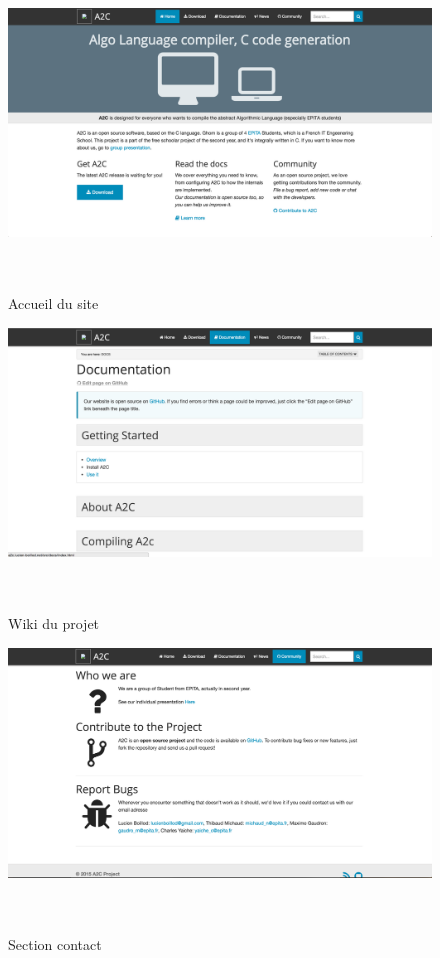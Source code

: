 \documentclass[12pt,a4paper]{report}
\begin{document}
\begin{figure}[H]
\includegraphics[scale=0.2]{website.png}~\\[1.5cm] \\
\caption{Accueil du site}
\end{figure}
\begin{figure}[H]
\includegraphics[scale=0.2]{website2.png}~\\[1.5cm] \\
\caption{Wiki du projet}
\end{figure}\begin{figure}[H]
\includegraphics[scale=0.2]{website3.png}~\\[1.5cm] \\
\caption{Section contact}
\end{figure}
\end{document}
